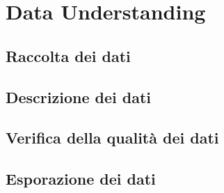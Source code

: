 \section{Data Understanding}

\subsection{Raccolta dei dati}

\subsection{Descrizione dei dati}

\subsection{Verifica della qualità dei dati}

\subsection{Esporazione dei dati}

